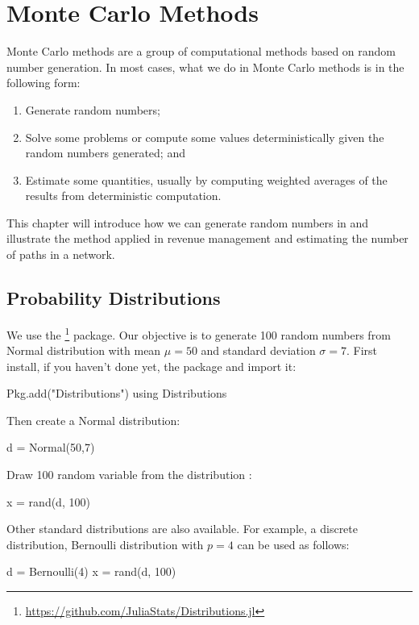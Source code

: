 \chapter{Monte Carlo Methods}

Monte Carlo methods are a group of computational methods based on random number generation. In most cases, what we do in Monte Carlo methods is in the following form:
\begin{enumerate}
    \item Generate random numbers;
    \item Solve some problems or compute some values deterministically given the random numbers generated; and
    \item Estimate some quantities, usually by computing weighted averages of the results from deterministic computation.
\end{enumerate}

This chapter will introduce how we can generate random numbers in \julia{} and illustrate the method applied in revenue management and estimating the number of paths in a network.


\section{Probability Distributions}

We use the \href{https://github.com/JuliaStats/Distributions.jl}{}\footnote{\url{https://github.com/JuliaStats/Distributions.jl}} package. Our objective is to generate 100 random numbers from Normal distribution with mean $\mu=50$ and standard deviation $\sigma=7$. First install, if you haven't done yet, the  package and import it:
\begin{code}
Pkg.add("Distributions")
using Distributions
\end{code}
\noindent Then create a Normal distribution:
\begin{code}
d = Normal(50,7)
\end{code}
\noindent Draw 100 random variable from the distribution :
\begin{code}
x = rand(d, 100)
\end{code}

Other standard distributions are also available. For example, a discrete distribution, Bernoulli distribution with $p=4$ can be used as follows:
\begin{code}
d = Bernoulli(4)
x = rand(d, 100)
\end{code}


